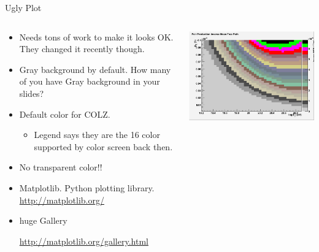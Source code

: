 \documentclass{beamer}
\begin{document}
\begin{frame}{Ugly Plot}
	\begin{columns}
	\begin{column}{0.6\textwidth}
	\begin{itemize}	
	\item Needs tons of work to make
	it looks OK. They changed it recently though.
	\item Gray background by default. How many of you have Gray
			background in your slides?
	\item Default color for COLZ.
		\begin{itemize}
			\item Legend says they are the 16 color supported 
			by color screen back then.
		\end{itemize}
	\item No transparent color!!

	\item Matplotlib. Python plotting library.
		\url{http://matplotlib.org/}
	\item huge Gallery 
	
	\url{http://matplotlib.org/gallery.html}

	\end{itemize}
	\end{column}
	\begin{column}{0.4\textwidth}
		\includegraphics[width=\textwidth]{pic/default_palette_400.png}
		

\end{column}
\end{columns}
\end{frame}
\end{document}
